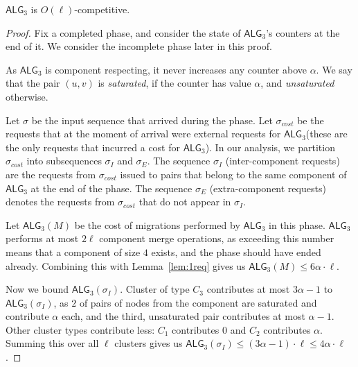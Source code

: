 \documentclass[manuscript,screen=true]{acmart}
\newcommand{\TAlg}{{\ensuremath{\textsf{ALG}_{3}}}\xspace} %
\begin{document}
\begin{theorem}
  \TAlg is $O(\ell)$-competitive.
\end{theorem}
\begin{proof}
  Fix a completed phase, and consider the state of \TAlg's counters at the end of it.
  We consider the incomplete phase later in this proof.

  As \TAlg is component respecting, it never increases any counter above $\alpha$.
  We say that the pair $(u, v)$ is \emph{saturated}, if the counter has value $\alpha$, and \emph{unsaturated} otherwise.


  Let $\sigma$ be the input sequence that arrived during the phase.
  Let $\sigma_{cost}$ be the requests that at the moment of arrival were external requests for \TAlg (these are the only requests that incurred a cost for \TAlg).
  In our analysis, we partition $\sigma_{cost}$ into subsequences $\sigma_I$ and $\sigma_E$.
  The sequence $\sigma_I$ (inter-component requests) are the requests from $\sigma_{cost}$ issued to pairs that belong to the same component of \TAlg at the end of the phase.
  The sequence $\sigma_E$ (extra-component requests) denotes the requests from $\sigma_{cost}$ that do not appear in $\sigma_I$.


  Let $\TAlg(M)$ be the cost of migrations performed by \TAlg in this phase.
  \TAlg performs at most $2 \ell$ component merge operations, as
  exceeding this number means that a component of size $4$ exists, and the phase should have ended already.
  Combining this with Lemma~\ref{lem:1req} gives us $\TAlg(M) \leq 6\alpha\cdot\ell$.
  
  Now we bound $\TAlg(\sigma_I)$.
  Cluster of type $C_3$ contributes at most $3 \alpha - 1$ to $\TAlg(\sigma_I)$, as $2$ of pairs of nodes from the component are saturated and contribute $\alpha$ each, and the third, unsaturated pair contributes at most $\alpha-1$.
  Other cluster types contribute less: $C_1$ contributes $0$ and $C_2$ contributes $\alpha$.
  Summing this over all $\ell$ clusters gives us $\TAlg(\sigma_I) \leq (3 \alpha-1)\cdot \ell \leq 4\alpha\cdot\ell$.


\end{proof}
\end{document}
